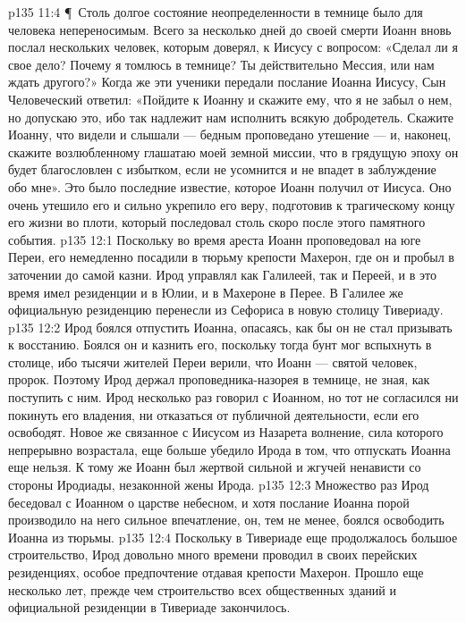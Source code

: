 \vs p135 11:4 \P\ Столь долгое состояние неопределенности в темнице было для человека непереносимым. Всего за несколько дней до своей смерти Иоанн вновь послал нескольких человек, которым доверял, к Иисусу с вопросом: «Сделал ли я свое дело? Почему я томлюсь в темнице? Ты действительно Мессия, или нам ждать другого?» Когда же эти ученики передали послание Иоанна Иисусу, Сын Человеческий ответил: «Пойдите к Иоанну и скажите ему, что я не забыл о нем, но допускаю это, ибо так надлежит нам исполнить всякую добродетель. Скажите Иоанну, что видели и слышали --- бедным проповедано утешение --- и, наконец, скажите возлюбленному глашатаю моей земной миссии, что в грядущую эпоху он будет благословлен с избытком, если не усомнится и не впадет в заблуждение обо мне». Это было последние известие, которое Иоанн получил от Иисуса. Оно очень утешило его и сильно укрепило его веру, подготовив к трагическому концу его жизни во плоти, который последовал столь скоро после этого памятного события.
\vs p135 12:1 Поскольку во время ареста Иоанн проповедовал на юге Переи, его немедленно посадили в тюрьму крепости Махерон, где он и пробыл в заточении до самой казни. Ирод управлял как Галилеей, так и Переей, и в это время имел резиденции и в Юлии, и в Махероне в Перее. В Галилее же официальную резиденцию перенесли из Сефориса в новую столицу Тивериаду.
\vs p135 12:2 Ирод боялся отпустить Иоанна, опасаясь, как бы он не стал призывать к восстанию. Боялся он и казнить его, поскольку тогда бунт мог вспыхнуть в столице, ибо тысячи жителей Переи верили, что Иоанн --- святой человек, пророк. Поэтому Ирод держал проповедника\hyp{}назорея в темнице, не зная, как поступить с ним. Ирод несколько раз говорил с Иоанном, но тот не согласился ни покинуть его владения, ни отказаться от публичной деятельности, если его освободят. Новое же связанное с Иисусом из Назарета волнение, сила которого непрерывно возрастала, еще больше убедило Ирода в том, что отпускать Иоанна еще нельзя. К тому же Иоанн был жертвой сильной и жгучей ненависти со стороны Иродиады, незаконной жены Ирода.
\vs p135 12:3 Множество раз Ирод беседовал с Иоанном о царстве небесном, и хотя послание Иоанна порой производило на него сильное впечатление, он, тем не менее, боялся освободить Иоанна из тюрьмы.
\vs p135 12:4 Поскольку в Тивериаде еще продолжалось большое строительство, Ирод довольно много времени проводил в своих перейских резиденциях, особое предпочтение отдавая крепости Махерон. Прошло еще несколько лет, прежде чем строительство всех общественных зданий и официальной резиденции в Тивериаде закончилось.
